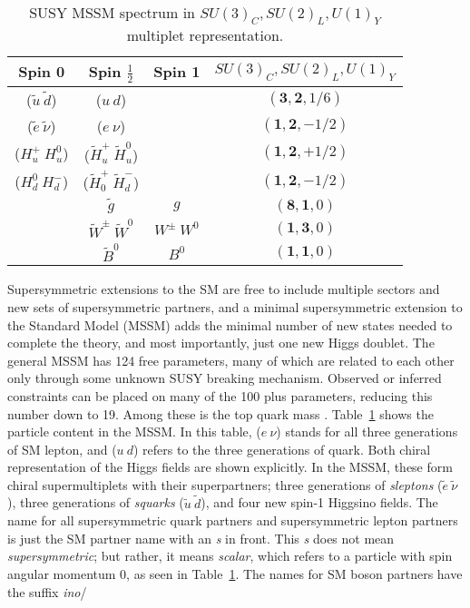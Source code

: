 \begin{table}[!htb]
\centering
\small
\begin{tabular}{|c|c|c|c|}
\hline
Spin 0  & Spin $\frac{1}{2}$& Spin 1 &  $SU(3)_{C}, SU(2)_{L}, U(1)_{Y}$ \\
\hline \hline
($\tilde{u}~\tilde{d}$) & ($u~d$)&   & $(\mathbf{3}, \mathbf{2}, 1/6)$ \\ 
\hline
($\tilde{e}~\tilde{\nu}$) & ($e~\nu$)&   & $(\mathbf{1}, \mathbf{2}, -1/2)$ \\
\hline
($H_u^+~H_u^0$)&($\tilde{H}_u^+~\tilde{H}_u^0$) && $(\mathbf{1}, \mathbf{2}, +1/2)$\\
($H_d^0~H_d^-$)&($\tilde{H}_0^+~\tilde{H}_d^-$) & &$(\mathbf{1}, \mathbf{2}, -1/2)$\\
\hline
 &$\tilde{g}$&  $g$ & $(\mathbf{8}, \mathbf{1}, 0)$ \\
\hline
& $\tilde{W}^\pm~ \tilde{W}^0$& $W^\pm~ W^0$ & $(\mathbf{1}, \mathbf{3}, 0)$  \\  
 & $\tilde{B}^0$& $B^0$ & $(\mathbf{1}, \mathbf{1}, 0)$\\ 
\hline

\hline %
\end{tabular}
\caption{SUSY MSSM spectrum in $SU(3)_{C}, SU(2)_{L}, U(1)_{Y}$ multiplet representation.}
\label{tab:susy}
\end{table}
Supersymmetric extensions to the SM are free to include multiple sectors and new sets of supersymmetric partners, and a minimal supersymmetric extension to the Standard Model (MSSM) adds the minimal number of new states needed to complete the theory, and most importantly, just one new Higgs doublet.  The general MSSM has 124 free parameters, many of which are related to each other only through some unknown SUSY breaking mechanism.  Observed or inferred constraints can be placed on many of the 100 plus parameters, reducing this number down to 19.  Among these is the top quark mass \cite{Bechtle2006}.  Table~\ref{tab:susy} shows the particle content in the MSSM.  In this table,  ($e~\nu$) stands for all three generations of SM lepton, and ($u~d$) refers to the three generations of quark.  Both chiral representation of the Higgs fields are shown explicitly.  In the MSSM, these form chiral supermultiplets with their superpartners; three generations of \textit{sleptons} ($\tilde{e}~\tilde{\nu}$), three generations of \textit{squarks} ($\tilde{u}~\tilde{d}$), and four new spin-1 Higgsino fields.  The name for all supersymmetric quark partners and supersymmetric lepton partners is just the SM partner name with an \textit{s} in front.  This \textit{s} does not mean \textit{supersymmetric}; but rather, it means \textit{scalar}, which refers to a particle with spin angular momentum 0, as seen in Table~\ref{tab:susy}.  The names for SM boson partners have the suffix \textit{ino}/

